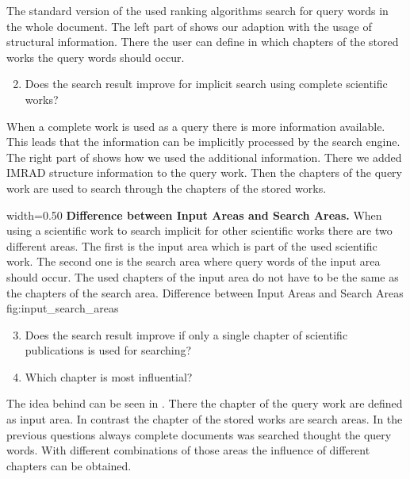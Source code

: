 The standard version of the used ranking algorithms search for query words in the whole document. The left part of  shows our adaption with the usage of structural information. There the user can define in which chapters of the stored works the query words should occur.

\begin{enumerate}[label=1.\arabic*]
  \setcounter{enumi}{1}
  \item Does the search result improve for implicit search using complete scientific works?
\end{enumerate}

When a complete work is used as a query there is more information available. This leads that the information can be implicitly processed by the search engine. The right part of  shows how we used the additional information. There we added IMRAD structure information to the query work. Then the chapters of the query work are used to search through the chapters of the stored works.

      {width=0.50\textwidth}
      {\textbf{Difference between Input Areas and Search Areas.} When using a scientific work to search implicit for other scientific works there are two different areas. The first is the input area which is part of the used scientific work. The second one is the search area where query words of the input area should occur. The used chapters of the input area do not have to be the same as the chapters of the search area.}
      {Difference between Input Areas and Search Areas}
      {fig:input_search_areas}

\begin{enumerate}[label=1.\arabic*]
  \setcounter{enumi}{2}
    \item Does the search result improve if only a single chapter of scientific publications is used for searching?
    \item Which chapter is most influential?
\end{enumerate}

The idea behind can be seen in . There the chapter of the query work are defined as input area. In contrast the chapter of the stored works are search areas. In the previous questions always complete documents was searched thought the query words. With different combinations of those areas the influence of different chapters can be obtained.
